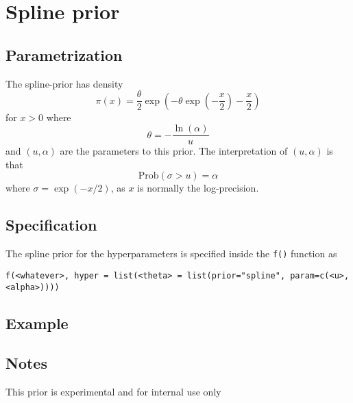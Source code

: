\documentclass[a4paper,11pt]{article}
\begin{document}
\section*{Spline prior}

\subsection*{Parametrization}
The spline-prior has density 
\begin{equation}
    \pi(x) = \frac{\theta}{2} \exp\left(
      -\theta\exp\left(-\frac{x}{2}\right) - \frac{x}{2}
    \right)
\end{equation}
for $x>0$ where
\begin{displaymath}
    \theta = -\frac{\ln(\alpha)}{u}
\end{displaymath}
and $(u, \alpha{})$ are the parameters to this prior. The
interpretation of $(u,\alpha)$ is that
\begin{displaymath}
    \text{Prob}(\sigma > u) = \alpha
\end{displaymath}
where $\sigma = \exp(-x/2)$, as $x$ is normally the log-precision.

\subsection*{Specification}
The spline prior for the hyperparameters is specified inside the
{\tt f()} function as 
\begin{center}
    {\tt f(<whatever>, hyper = list(<theta> =
        list(prior="spline", param=c(<u>,<alpha>))))}
\end{center}

\subsection*{Example}

\subsection*{Notes}
This prior is experimental and for internal use only
\end{document}
